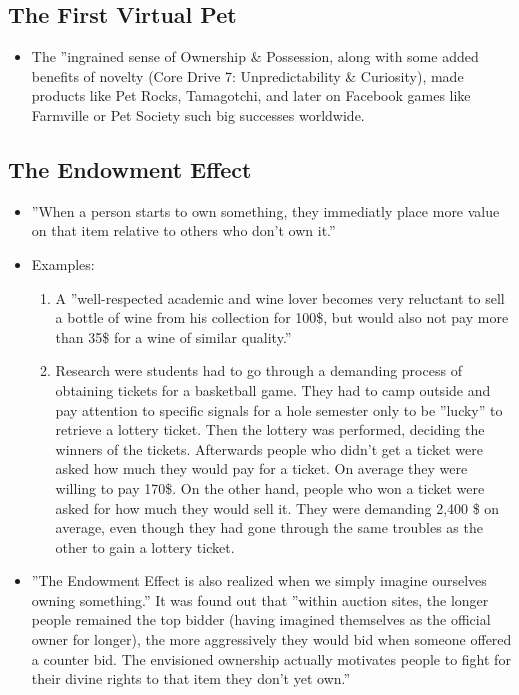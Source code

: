 \subsection{The First Virtual Pet}
\begin{itemize}
    \item The ''ingrained sense of Ownership \& Possession, along with some added benefits of novelty (Core Drive 7: Unpredictability \& Curiosity), made products like Pet Rocks, Tamagotchi, and later on Facebook games like Farmville or Pet Society such big successes worldwide.
\end{itemize}

\subsection{The Endowment Effect}
\begin{itemize}
    \item ''When a person starts to own something, they immediatly place more value on that item relative to others who don't own it.''
    \item Examples:
    \begin{enumerate}
        \item A ''well-respected academic and wine lover becomes very reluctant to sell a bottle of wine from his collection for 100\$, but would also not pay more than 35\$ for a wine of similar quality.''
        \item Research were students had to go through a demanding process of obtaining tickets for a basketball game. They had to camp outside and pay attention to specific signals for a hole semester only to be ''lucky'' to retrieve a lottery ticket. Then the lottery was performed, deciding the winners of the tickets. Afterwards people who didn't get a ticket were asked how much they would pay for a ticket. On average they were willing to pay 170\$. On the other hand, people who won a ticket were asked for how much they would sell it. They were demanding 2,400 \$ on average, even though they had gone through the same troubles as the other to gain a lottery ticket.
    \end{enumerate}
    \item ''The Endowment Effect is also realized when we simply imagine ourselves owning something.'' It was found out that ''within auction sites, the longer people remained the top bidder (having imagined themselves as the official owner for longer), the more aggressively they would bid when someone offered a counter bid. The envisioned ownership actually motivates people to fight for their divine rights to that item they don't yet own.''
\end{itemize}

